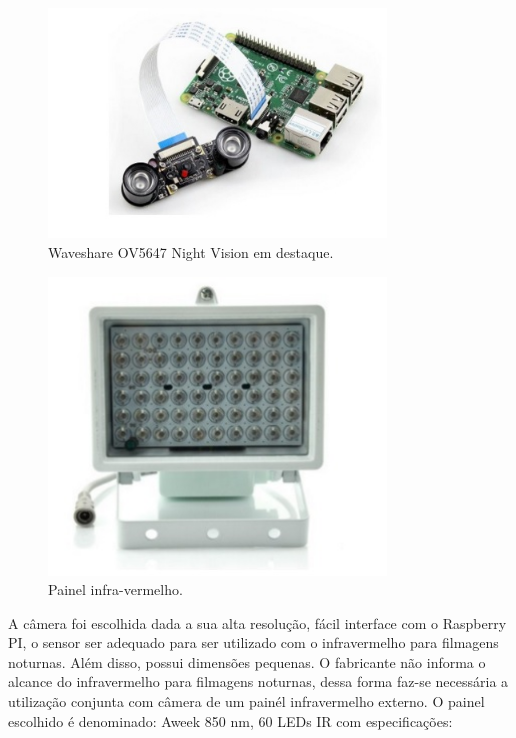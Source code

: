 \begin{figure}[H]
  \centering
  \includegraphics[width=0.8\textwidth]{figuras/RSP}
  \caption{Waveshare OV5647 Night Vision em destaque.}
  \label{img:Waveshare}
\end{figure}

\begin{figure}[H]
  \centering
  \includegraphics[width=0.8\textwidth]{figuras/Painel}
  \caption{Painel infra-vermelho.}
  \label{img:painel}
\end{figure}

A câmera foi escolhida dada a sua alta resolução, fácil interface com o Raspberry PI, o sensor ser adequado para ser utilizado com o infravermelho para filmagens noturnas. Além disso, possui dimensões pequenas. O fabricante não informa o alcance do infravermelho para filmagens noturnas, dessa forma faz-se necessária a utilização conjunta com  câmera de um painél infravermelho externo. O painel escolhido é denominado: Aweek 850 nm, 60 LEDs IR com especificações:

